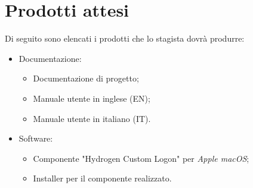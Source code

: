 \section*{Prodotti attesi}
Di seguito sono elencati i prodotti che lo stagista dovrà produrre:
\begin{itemize}
	\item Documentazione:
	\begin{itemize}
		\item Documentazione di progetto;
		\item Manuale utente in inglese (EN);
		\item Manuale utente in italiano (IT).
	\end{itemize}
	\item Software:
	\begin{itemize}
		\item Componente "Hydrogen Custom Logon" per \textit{Apple macOS};
		\item Installer per il componente realizzato.
	\end{itemize}
\end{itemize}

%
%    
%    

